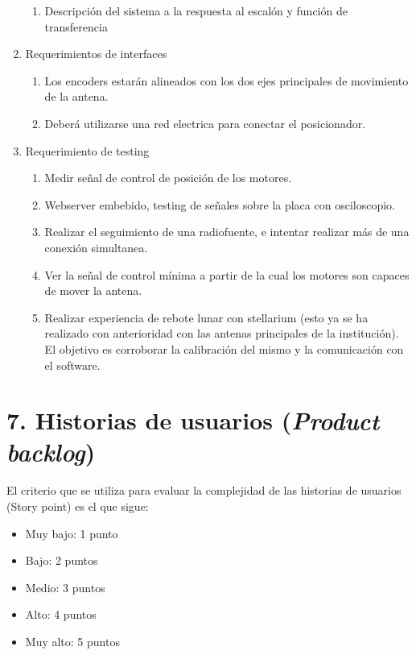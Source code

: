 \documentclass[11pt, %
codirector, %
]{charter}
\begin{document}
\begin{enumerate}
\begin{enumerate}
			\item Descripción del sistema a la respuesta al escalón y función de transferencia
	\end{enumerate}
	\item Requerimientos de interfaces
		\begin{enumerate}
			\item Los encoders estarán alineados con los dos ejes principales de movimiento de la antena. 
			\item Deberá utilizarse una red electrica para conectar el posicionador.
		\end{enumerate}
	\item Requerimiento de testing
		\begin{enumerate}
			\item Medir señal de control de posición de los motores.
			\item Webserver embebido, testing de señales sobre la placa con osciloscopio.
			\item Realizar el seguimiento de una radiofuente, e intentar realizar más de una conexión simultanea. 
			\item Ver la señal de control mínima a partir de la cual los motores son capaces de mover la antena. 
			\item Realizar experiencia de rebote lunar con stellarium (esto ya se ha realizado con anterioridad con las antenas principales de la institución). El objetivo es corroborar la calibración del mismo y la comunicación con el software.  

		\end{enumerate}
\end{enumerate}

\section{7. Historias de usuarios (\textit{Product backlog})}
\label{sec:backlog}

%
%
%
El criterio que se utiliza para evaluar la complejidad de las  historias de usuarios (Story point) es el que sigue:
\begin{itemize}
	\item Muy bajo: 1 punto 
	\item Bajo: 2 puntos
	\item Medio: 3 puntos 
	\item Alto: 4 puntos 
	\item Muy alto: 5 puntos
\end{itemize}
\end{document}

